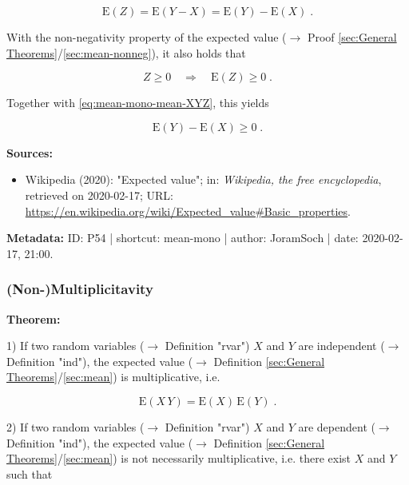 \documentclass[a4paper,12pt]{book}
\begin{document}
\begin{equation} \label{eq:mean-mono-mean-XYZ}
\mathrm{E}(Z) = \mathrm{E}(Y-X) = \mathrm{E}(Y) - \mathrm{E}(X) \; .
\end{equation}

With the non-negativity property of the expected value ($\rightarrow$ Proof \ref{sec:General Theorems}/\ref{sec:mean-nonneg}), it also holds that

\begin{equation} \label{eq:mean-mono-mean-Z}
Z \geq 0 \quad \Rightarrow \quad \mathrm{E}(Z) \geq 0 \; .
\end{equation}

Together with \eqref{eq:mean-mono-mean-XYZ}, this yields

\begin{equation} \label{eq:mean-mono-mean-mono-qed}
\mathrm{E}(Y) - \mathrm{E}(X) \geq 0 \; .
\end{equation}

\vspace{1em}
\textbf{Sources:}
\begin{itemize}
\item Wikipedia (2020): "Expected value"; in: \textit{Wikipedia, the free encyclopedia}, retrieved on 2020-02-17; URL: \url{https://en.wikipedia.org/wiki/Expected_value#Basic_properties}.
\end{itemize}


\vspace{1em}
\textbf{Metadata:} ID: P54 | shortcut: mean-mono | author: JoramSoch | date: 2020-02-17, 21:00.


\subsubsection[\textbf{(Non-)Multiplicitavity}]{(Non-)Multiplicitavity} \label{sec:mean-mult}

\vspace{1em}
\textbf{Theorem:}

1) If two random variables ($\rightarrow$ Definition "rvar") $X$ and $Y$ are independent ($\rightarrow$ Definition "ind"), the expected value ($\rightarrow$ Definition \ref{sec:General Theorems}/\ref{sec:mean}) is multiplicative, i.e.

\begin{equation} \label{eq:mean-mult-mean-mult}
\mathrm{E}(X\,Y) = \mathrm{E}(X) \, \mathrm{E}(Y) \; .
\end{equation}

2) If two random variables ($\rightarrow$ Definition "rvar") $X$ and $Y$ are dependent ($\rightarrow$ Definition "ind"), the expected value ($\rightarrow$ Definition \ref{sec:General Theorems}/\ref{sec:mean}) is not necessarily multiplicative, i.e. there exist $X$ and $Y$ such that
\end{document}
